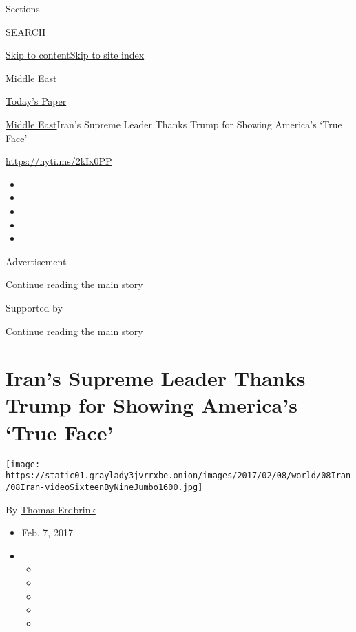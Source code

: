 Sections

SEARCH

\protect\hyperlink{site-content}{Skip to
content}\protect\hyperlink{site-index}{Skip to site index}

\href{https://www.nytimes3xbfgragh.onion/section/world/middleeast}{Middle
East}

\href{https://myaccount.nytimes3xbfgragh.onion/auth/login?response_type=cookie\&client_id=vi}{}

\href{https://www.nytimes3xbfgragh.onion/section/todayspaper}{Today's
Paper}

\href{/section/world/middleeast}{Middle East}\textbar{}Iran's Supreme
Leader Thanks Trump for Showing America's `True Face'

\url{https://nyti.ms/2kIx0PP}

\begin{itemize}
\item
\item
\item
\item
\item
\end{itemize}

Advertisement

\protect\hyperlink{after-top}{Continue reading the main story}

Supported by

\protect\hyperlink{after-sponsor}{Continue reading the main story}

\hypertarget{irans-supreme-leader-thanks-trump-for-showing-americas-true-face}{%
\section{Iran's Supreme Leader Thanks Trump for Showing America's `True
Face'}\label{irans-supreme-leader-thanks-trump-for-showing-americas-true-face}}

\texttt{[image: https://static01.graylady3jvrrxbe.onion/images/2017/02/08/world/08Iran/08Iran-videoSixteenByNineJumbo1600.jpg]}

By \href{http://www.nytimes3xbfgragh.onion/by/thomas-erdbrink}{Thomas
Erdbrink}

\begin{itemize}
\item
  Feb. 7, 2017
\item
  \begin{itemize}
  \item
  \item
  \item
  \item
  \item
  \end{itemize}
\end{itemize}

